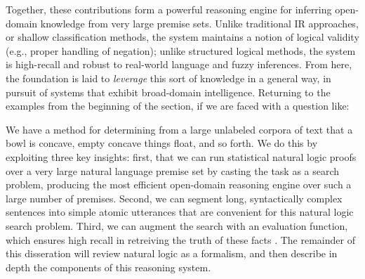 %
%
Together, these contributions form a powerful reasoning engine for inferring open-domain
  knowledge from very large premise sets.
Unlike traditional IR approaches, or shallow classification methods, the system maintains
  a notion of logical validity (e.g., proper handling of negation);
  unlike structured logical methods, the system is high-recall and robust to
  real-world language and fuzzy inferences.
From here, the foundation is laid to \textit{leverage} this sort of knowledge in a
  general way, in pursuit of systems that exhibit broad-domain intelligence.
Returning to the examples from the beginning of the section, if we are faced with a question like:

\begin{displayquote}
\end{displayquote}

\noindent We have a method for determining from a large unlabeled corpora of text
  that a bowl is concave, empty concave things float, and so forth.
We do this by exploiting three key insights: first, that we can run statistical natural logic proofs
  over a very large natural language premise set by casting the task as a search problem, producing
  the most efficient open-domain reasoning engine over such a large number of premises.
Second, we can segment long, syntactically complex sentences into simple atomic utterances that are
  convenient for this natural logic search problem.
Third, we can augment the search with an evaluation function, which ensures high recall in retreiving
  the truth of these facts .
The remainder of this disseration will review natural logic as a formalism, and then describe in depth
  the components of this reasoning system.
